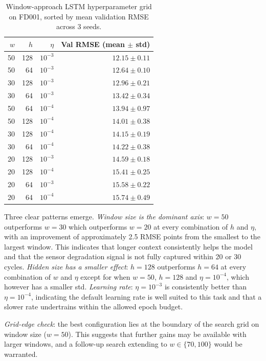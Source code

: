 \documentclass[a4paper,11pt]{article}
\begin{document}
\begin{table}[h]
    \centering
    \begin{tabular}{rrrr}
        \hline
        $w$ & $h$ & $\eta$ & Val RMSE (mean $\pm$ std) \\
        \hline
        50 & 128 & $10^{-3}$ & $12.15 \pm 0.11$ \\
        50 & 64  & $10^{-3}$ & $12.64 \pm 0.10$ \\
        30 & 128 & $10^{-3}$ & $12.96 \pm 0.21$ \\
        30 & 64  & $10^{-3}$ & $13.42 \pm 0.34$ \\
        50 & 64  & $10^{-4}$ & $13.94 \pm 0.97$ \\
        50 & 128 & $10^{-4}$ & $14.01 \pm 0.38$ \\
        30 & 128 & $10^{-4}$ & $14.15 \pm 0.19$ \\
        30 & 64  & $10^{-4}$ & $14.22 \pm 0.38$ \\
        20 & 128 & $10^{-3}$ & $14.59 \pm 0.18$ \\
        20 & 128 & $10^{-4}$ & $15.41 \pm 0.25$ \\
        20 & 64  & $10^{-3}$ & $15.58 \pm 0.22$ \\
        20 & 64  & $10^{-4}$ & $15.74 \pm 0.49$ \\
        \hline
    \end{tabular}
    \caption{Window-approach LSTM hyperparameter grid on FD001, sorted by mean validation RMSE across 3 seeds.}
    \label{tab:hparam_window}
\end{table}

Three clear patterns emerge.
\textit{Window size is the dominant axis}: $w=50$ outperforms $w=30$ which outperforms $w=20$ at every combination of $h$ and $\eta$, with an improvement of approximately 2.5 RMSE points from the smallest to the largest window.
This indicates that longer context consistently helps the model and that the sensor degradation signal is not fully captured within 20 or 30 cycles.
\textit{Hidden size has a smaller effect}: $h=128$ outperforms $h=64$ at every combination of $w$ and $\eta$ except for when $w=50$, $h=128$ and $\eta=10^{-4}$, which however has a smaller std.
\textit{Learning rate}: $\eta=10^{-3}$ is consistently better than $\eta=10^{-4}$, indicating the default learning rate is well suited to this task and that a slower rate undertrains within the allowed epoch budget.

\textit{Grid-edge check}: the best configuration lies at the boundary of the search grid on window size ($w=50$).
This suggests that further gains may be available with larger windows, and a follow-up search extending to $w \in \{70, 100\}$ would be warranted.
\end{document}
